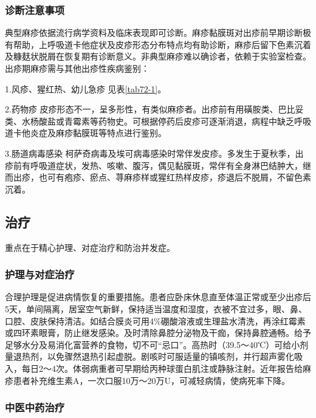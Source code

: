 \subsubsection{诊断注意事项}

典型麻疹依据流行病学资料及临床表现即可诊断。麻疹黏膜斑对出疹前早期诊断极有帮助，上呼吸道卡他症状及皮疹形态分布特点均有助诊断，麻疹后留下色素沉着及糠麸状脱屑在恢复期有诊断意义。非典型麻疹难以确诊者，依赖于实验室检查。出疹期麻疹需与其他出疹性疾病鉴别：

1.风疹、猩红热、幼儿急疹 见表\ref{tab72-1}。

2.药物疹
皮疹形态不一，呈多形性，有类似麻疹者。出疹前有用磺胺类、巴比妥类、水杨酸盐或青霉素等药物史。可根据停药后皮疹可逐渐消退，病程中缺乏呼吸道卡他炎症及麻疹黏膜斑等特点进行鉴别。

3.肠道病毒感染
柯萨奇病毒及埃可病毒感染时常伴发皮疹。多发生于夏秋季，出疹前有呼吸道症状，发热、咳嗽、腹泻，偶见黏膜斑，常伴有全身淋巴结肿大，继而出疹，也可有疱疹、瘀点、荨麻疹样或猩红热样皮疹，疹退后不脱屑，不留色素沉着。

\subsection{治疗}

重点在于精心护理、对症治疗和防治并发症。

\subsubsection{护理与对症治疗}

合理护理是促进病情恢复的重要措施。患者应卧床休息直至体温正常或至少出疹后5天，单间隔离，居室空气新鲜，保持适当温度和湿度，衣被不宜过多，眼、鼻、口腔、皮肤保持清洁。如结合膜炎可用4\%硼酸溶液或生理盐水清洗，再涂红霉素或四环素眼膏，防止继发感染。及时清除鼻腔分泌物及干痂，保持鼻腔通畅。给予足够水分及易消化富营养的食物，切不可“忌口”。高热时（39.5～40℃）可给小剂量退热剂，以免骤然退热引起虚脱。剧咳时可服适量的镇咳剂，并行超声雾化吸入，每日2～4次。体弱病重者可早期给丙种球蛋白肌注或静脉注射。近年报告给麻疹患者补充维生素A，一次口服10万～20万U，可减轻病情，使病死率下降。

\subsubsection{中医中药治疗}

